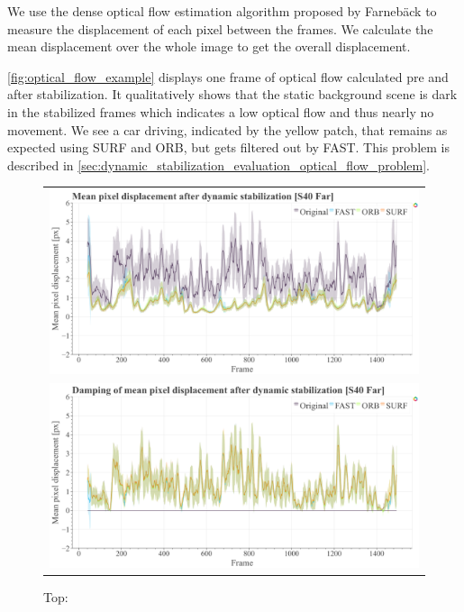 We use the dense optical flow estimation algorithm proposed by Farnebäck \cite{farnback10.1007/3-540-45103-X_50,opencv_library} to measure the displacement of each pixel between the frames. 
We calculate the mean displacement over the whole image to get the overall displacement. 

\autoref{fig:optical_flow_example} displays one frame of optical flow calculated pre and after stabilization.
It qualitatively shows that the static background scene is dark in the stabilized frames which indicates a low optical flow and thus nearly no movement. 
We see a car driving, indicated by the yellow patch, that remains as expected using SURF and ORB, but gets filtered out by FAST. This problem is described in \autoref{sec:dynamic_stabilization_evaluation_optical_flow_problem}.     

\begin{figure}[t]
    \centering
    \begin{tabular}{c}
      \includegraphics[width=0.9\linewidth]{diagrams/optical_flow/s40_n_far_image_raw.mp4.csv/compare_of_mean_pixel_displacement/window_size_12.html.png}    \\  
      \includegraphics[width=0.9\linewidth]{diagrams/optical_flow/s40_n_far_image_raw.mp4.csv/deltas_of_mean_pixel_displacement/window_size_12.html.png}    
\end{tabular}
    \caption{Top: 
}
\end{figure}
